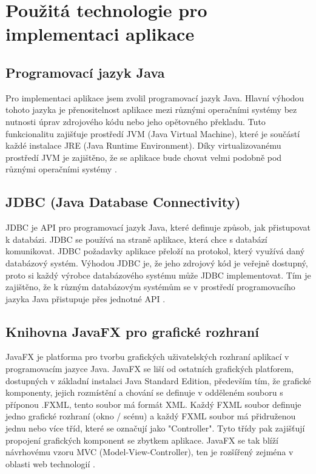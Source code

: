 \documentclass[czech,bachelor,public,dept460,male,cpdeclaration,twoside]{diploma}
\begin{document}
\section{Použitá technologie pro implementaci aplikace} \label{tech}

\subsection{Programovací jazyk Java}
Pro implementaci aplikace jsem zvolil programovací jazyk Java. Hlavní výhodou tohoto jazyka je přenositelnost aplikace mezi různými operačními systémy bez nutnosti úprav zdrojového kódu nebo jeho opětovného překladu. Tuto funkcionalitu zajišťuje prostředí JVM (Java Virtual Machine), které je součástí každé instalace JRE (Java Runtime Environment). Díky virtualizovanému prostředí JVM je zajištěno, že se aplikace bude chovat velmi podobně pod různými operačními systémy \cite{java}.

\subsection{JDBC (Java Database Connectivity)} \label{jdbc}
JDBC je API pro programovací jazyk Java, které definuje způsob, jak přistupovat k databázi. JDBC se používá na straně aplikace, která chce s databází komunikovat. JDBC požadavky aplikace přeloží na protokol, který využívá daný databázový systém. Výhodou JDBC je, že jeho zdrojový kód je veřejně dostupný, proto si každý výrobce databázového systému může JDBC implementovat. Tím je zajištěno, že k různým databázovým systémům se v prostředí programovacího jazyka Java přistupuje přes jednotné API \cite{jdbc}.


\subsection{Knihovna JavaFX pro grafické rozhraní}
JavaFX je platforma pro tvorbu grafických uživatelských rozhraní aplikací v programovacím jazyce Java. JavaFX se liší od ostatních grafických platforem, dostupných v základní instalaci Java Standard Edition, především tím, že grafické komponenty, jejich rozmístění a chování se definuje v odděleném souboru s příponou .FXML, tento soubor má formát XML. Každý FXML soubor definuje jedno grafické rozhraní (okno / scénu) a každý FXML soubor má přidruženou jednu nebo více tříd, které se označují jako "Controller". Tyto třídy pak zajišťují propojení grafických komponent se zbytkem aplikace. JavaFX se tak blíží návrhovému vzoru MVC (Model-View-Controller), ten je rozšířený zejména v oblasti web technologií \cite{javafx}.
\end{document}
